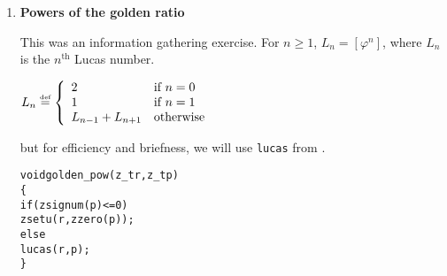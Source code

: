 \begin{enumerate}[label=\textbf{\arabic*}.]
\item \textbf{Powers of the golden ratio}

This was an information gathering exercise.
For $n \ge 1$, $L_n = [\varphi^n]$, where
$L_n$ is the $n^\text{th}$ Lucas number.

\( \displaystyle{
    L_n \stackrel{\text{\tiny{def}}}{\text{=}} \left \{ \begin{array}{ll}
      2 & \text{if} ~ n = 0 \\
      1 & \text{if} ~ n = 1 \\
      L_{n - 1} + L_{n + 1} & \text{otherwise}
    \end{array} \right .
}\)

\noindent
but for efficiency and briefness, we will use
\texttt{lucas} from .

\vspace{-1em}
\begin{alltt}
void golden_pow(z_t r, z_t p)
\{
    if (zsignum(p) <= 0)
        zsetu(r, zzero(p));
    else
        lucas(r, p);
\}
\end{alltt}



\end{enumerate}
